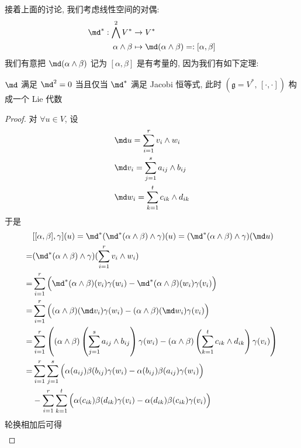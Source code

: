     接着上面的讨论, 我们考虑线性空间的对偶:
    \begin{align*}
        \md^*:\bigwedge^2V^*&\rightarrow V^*\\
        \alpha\wedge\beta&\mapsto \md(\alpha\wedge \beta)=:[\alpha,\beta]
    \end{align*}
    我们有意把 $\md(\alpha\wedge\beta)$ 记为 $[\alpha,\beta]$ 是有考量的, 因为我们有如下定理:
    \begin{theorem}\label{lie}
        $\md$ 满足 $\md^2 = 0$ 当且仅当 $\md^*$ 满足 {\rm Jacobi} 恒等式, 此时 $(\mathfrak{g} = V^*,\,[\cdot,\cdot])$ 构成一个 {\rm Lie} 代数
    \end{theorem}
    \begin{proof}
        对 $\forall u\in V$, 设 
        \begin{align*}
            &\md u=\sum\limits_{i=1}^{r}v_i\wedge w_i \\
            &\md v_i=\sum\limits_{j=1}^{s}a_{ij}\wedge b_{ij} \\
            &\md w_i=\sum\limits_{k=1}^{t}c_{ik}\wedge d_{ik}
        \end{align*}
        于是
        \begin{align*}
            &[[\alpha,\beta],\gamma](u) 
            = \md^*(\md^*(\alpha\wedge\beta)\wedge\gamma)(u) 
            = (\md^*(\alpha\wedge\beta)\wedge\gamma)(\md u) \\
            =&(\md^*(\alpha\wedge\beta)\wedge\gamma)(\sum_{i=1}^{r}v_i\wedge w_i) \\
            =&\sum_{i=1}^{r}\Big(\md^*(\alpha\wedge\beta)(v_i)\gamma(w_i)-\md^*(\alpha\wedge\beta)(w_i)\gamma(v_i)\Big) \\
            =&\sum_{i=1}^{r}\Big((\alpha\wedge\beta)(\md v_i)\gamma(w_i)-(\alpha\wedge\beta)(\md w_i)\gamma(v_i)\Big) \\
            =&\sum_{i=1}^{r}\left((\alpha\wedge\beta)\left(\sum_{j=1}^{s}a_{ij}\wedge b_{ij}\right)\gamma(w_i)-(\alpha\wedge\beta)\left(\sum_{k=1}^{t}c_{ik}\wedge d_{ik}\right)\gamma(v_i)\right) \\
            =&\sum_{i=1}^{r}\sum_{j=1}^{s}\Big(\alpha(a_{ij})\beta(b_{ij})\gamma(w_i)-\alpha(b_{ij})\beta(a_{ij})\gamma(w_i)\Big) \\
            &-\sum_{i=1}^{r}\sum_{k=1}^{t}\Big(\alpha(c_{ik})\beta(d_{ik})\gamma(v_i)-\alpha(d_{ik})\beta(c_{ik})\gamma(v_i)\Big) \\
        \end{align*}
        轮换相加后可得
        \begin{align*}

\end{align*}
\end{proof}

